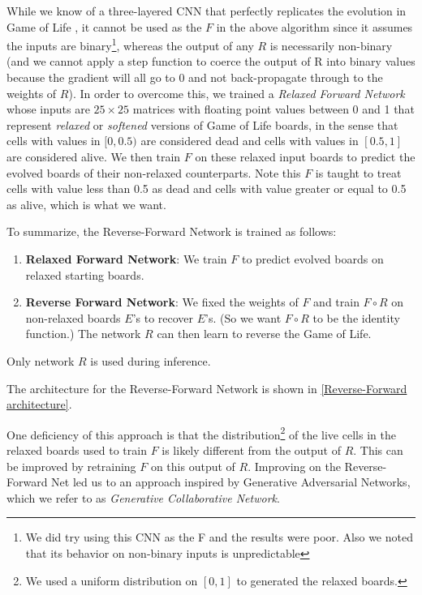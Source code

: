 \documentclass[conference]{IEEEtran}
\newcommand\todo[1]{\textcolor{red}{#1}}
\begin{document}
While we know of a three-layered CNN that perfectly replicates the evolution in Game of Life \cite{b5}, it cannot be used as the $F$ in the above algorithm since it assumes the inputs are binary\footnote{We did try using this CNN as the F and the results were poor. Also we noted that its behavior on non-binary inputs is unpredictable}, whereas the output of any $R$ is necessarily non-binary (and we cannot apply a step function to coerce the output of R into binary values because the gradient will all go to 0 and not back-propagate through to the weights of $R$). In order to overcome this, we trained a \emph{Relaxed Forward Network} whose inputs are $25 \times 25$ matrices with floating point values between 0 and 1 that represent \emph{relaxed} or \emph{softened} versions of Game of Life boards, in the sense that cells with values in $[0, 0.5)$ are considered dead and cells with values in $[0.5, 1]$ are considered alive. We then train $F$ on these relaxed input boards to predict the evolved boards of their non-relaxed counterparts. Note this $F$ is taught to treat cells with value less than 0.5 as dead and cells with value greater or equal to 0.5 as alive, which is what we want.

To summarize, the Reverse-Forward Network is trained as follows:
\begin{enumerate}
    \item \textbf{Relaxed Forward Network}: We train $F$ to predict evolved boards on relaxed starting boards.
    \item \textbf{Reverse Forward Network}: We fixed the weights of $F$ and train $F \circ R$ on non-relaxed boards $E$'s to recover $E$'s. (So we want $F \circ R$ to be the identity function.) The network $R$ can then learn to reverse the Game of Life.
\end{enumerate}

Only network $R$ is used during inference.

The architecture for the Reverse-Forward Network is shown in \todo{\ref{Reverse-Forward architecture}}.

One deficiency of this approach is that the distribution\footnote{We used a uniform distribution on $[0, 1]$ to generated the relaxed boards.} of the live cells in the relaxed boards used to train $F$ is likely different from the output of $R$. This can be improved by retraining $F$ on this output of $R$. Improving on the Reverse-Forward Net led us to an approach inspired by Generative Adversarial Networks, which we refer to as \emph{Generative Collaborative Network}.
\end{document}
